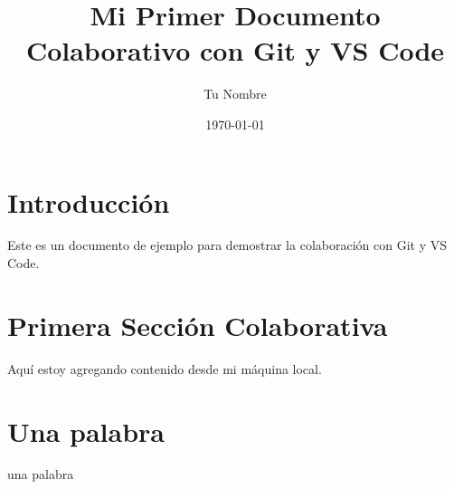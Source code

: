 \documentclass{article}
\title{Mi Primer Documento Colaborativo con Git y VS Code}
\author{Tu Nombre}
\date{\today}
\begin{document}
\maketitle

\section{Introducción}
Este es un documento de ejemplo para demostrar la colaboración con Git y VS Code.

\section{Primera Sección Colaborativa}
Aquí estoy agregando contenido desde mi máquina local.

\section{Una palabra}
una palabra
\end{document}
